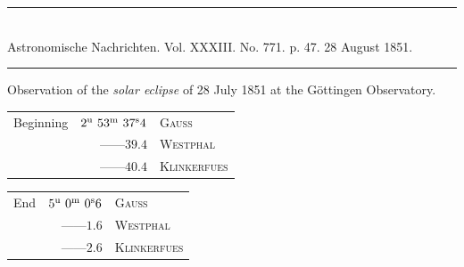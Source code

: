 \clearpage
{}
\begin{center}
\rule{0.55\linewidth}{0.4pt}\\[2pt]
Astronomische Nachrichten. Vol. XXXIII. No. 771. p. 47. 28 August 1851.\\[2pt]
\rule{0.55\linewidth}{0.4pt}
\end{center}
\begin{center}Observation of the \emph{solar eclipse} of 28 July 1851 at the Göttingen Observatory.\end{center}

\begin{center}
\begin{tabular}{lrl}
Beginning & $2^{\rm u}\ 53^{\rm m}\ 37^{\rm s}4$ & \textsc{Gauss} \\
 & \mbox{---\quad---}\quad $39.4$ & \textsc{Westphal} \\
 & \mbox{---\quad---}\quad $40.4$ & \textsc{Klinkerfues} \\
\end{tabular}
\end{center}
\begin{center}
\begin{tabular}{lrl}
End & $5^{\rm u}\ 0^{\rm m}\ 0^{\rm s}6$ & \textsc{Gauss} \\
 & \mbox{---\quad---}\quad $1.6$ & \textsc{Westphal} \\
 & \mbox{---\quad---}\quad $2.6$ & \textsc{Klinkerfues} \\
\end{tabular}
\end{center}


